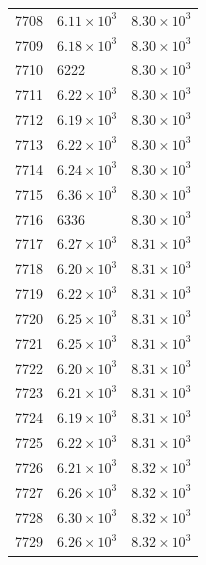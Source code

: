 \begin{table}[H]
\begin{tabular}{lll}
7708 & $\displaystyle 6.11 \times 10^{3}$ & $\displaystyle 8.30 \times 10^{3}$ \\
7709 & $\displaystyle 6.18 \times 10^{3}$ & $\displaystyle 8.30 \times 10^{3}$ \\
7710 & 6222 & $\displaystyle 8.30 \times 10^{3}$ \\
7711 & $\displaystyle 6.22 \times 10^{3}$ & $\displaystyle 8.30 \times 10^{3}$ \\
7712 & $\displaystyle 6.19 \times 10^{3}$ & $\displaystyle 8.30 \times 10^{3}$ \\
7713 & $\displaystyle 6.22 \times 10^{3}$ & $\displaystyle 8.30 \times 10^{3}$ \\
7714 & $\displaystyle 6.24 \times 10^{3}$ & $\displaystyle 8.30 \times 10^{3}$ \\
7715 & $\displaystyle 6.36 \times 10^{3}$ & $\displaystyle 8.30 \times 10^{3}$ \\
7716 & 6336 & $\displaystyle 8.30 \times 10^{3}$ \\
7717 & $\displaystyle 6.27 \times 10^{3}$ & $\displaystyle 8.31 \times 10^{3}$ \\
7718 & $\displaystyle 6.20 \times 10^{3}$ & $\displaystyle 8.31 \times 10^{3}$ \\
7719 & $\displaystyle 6.22 \times 10^{3}$ & $\displaystyle 8.31 \times 10^{3}$ \\
7720 & $\displaystyle 6.25 \times 10^{3}$ & $\displaystyle 8.31 \times 10^{3}$ \\
7721 & $\displaystyle 6.25 \times 10^{3}$ & $\displaystyle 8.31 \times 10^{3}$ \\
7722 & $\displaystyle 6.20 \times 10^{3}$ & $\displaystyle 8.31 \times 10^{3}$ \\
7723 & $\displaystyle 6.21 \times 10^{3}$ & $\displaystyle 8.31 \times 10^{3}$ \\
7724 & $\displaystyle 6.19 \times 10^{3}$ & $\displaystyle 8.31 \times 10^{3}$ \\
7725 & $\displaystyle 6.22 \times 10^{3}$ & $\displaystyle 8.31 \times 10^{3}$ \\
7726 & $\displaystyle 6.21 \times 10^{3}$ & $\displaystyle 8.32 \times 10^{3}$ \\
7727 & $\displaystyle 6.26 \times 10^{3}$ & $\displaystyle 8.32 \times 10^{3}$ \\
7728 & $\displaystyle 6.30 \times 10^{3}$ & $\displaystyle 8.32 \times 10^{3}$ \\
7729 & $\displaystyle 6.26 \times 10^{3}$ & $\displaystyle 8.32 \times 10^{3}$ \\

\end{tabular}
\end{table}
